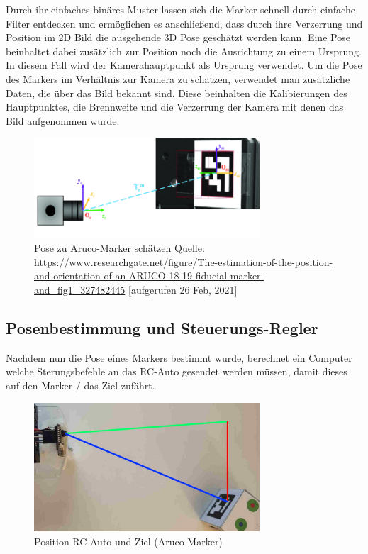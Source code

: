 \documentclass{article}
\begin{document}
Durch ihr einfaches binäres Muster lassen sich die Marker schnell durch einfache Filter entdecken und ermöglichen es anschließend,
dass durch ihre Verzerrung und Position im 2D Bild die ausgehende 3D Pose geschätzt werden kann. Eine Pose beinhaltet dabei zusätzlich
zur Position noch die Ausrichtung zu einem Ursprung. In diesem Fall wird der Kamerahauptpunkt als Ursprung verwendet.
Um die Pose des Markers im Verhältnis zur Kamera zu schätzen, verwendet man zusätzliche Daten,
die über das Bild bekannt sind. Diese beinhalten die Kalibierungen des Hauptpunktes,
die Brennweite und die Verzerrung der Kamera mit denen das Bild aufgenommen wurde.

\begin{figure}[H]
  \begin{center}
    \includegraphics[width=0.75\textwidth]{aruco-detection}
    \caption{Pose zu Aruco-Marker schätzen
    Quelle: \url{https://www.researchgate.net/figure/The-estimation-of-the-position-and-orientation-of-an-ARUCO-18-19-fiducial-marker-and_fig1_327482445} [aufgerufen 26 Feb, 2021]}
  \end{center}
\end{figure}

\subsection{Posenbestimmung und Steuerungs-Regler}

Nachdem nun die Pose eines Markers bestimmt wurde, berechnet ein Computer welche Sterungsbefehle an das RC-Auto gesendet werden müssen,
damit dieses auf den Marker / das Ziel zufährt.

\begin{figure}[H]
  \begin{center}
    \includegraphics[width=0.75\textwidth]{auto-aruco}
    \caption{Position RC-Auto und Ziel (Aruco-Marker)}
    \label{fig:auto-aruco}
  \end{center}
\end{figure}
\end{document}
